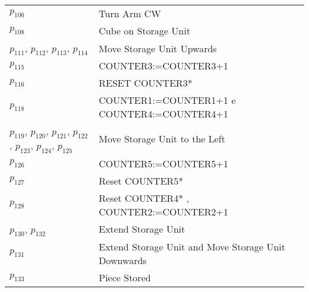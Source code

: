 \begin{longtable}{M{5cm}M{10cm}}
\hyperlink{completeNet:p106}{\hypertarget{completeTable:p106}{$p_{106}$}} & Turn Arm CW\\
\hyperlink{completeNet:p108}{\hypertarget{completeTable:p108}{$p_{108}$}} & Cube on Storage Unit\\
\hyperlink{completeNet:p111}{\hypertarget{completeTable:p111}{$p_{111}$}}, \hyperlink{completeNet:p112}{\hypertarget{completeTable:p112}{$p_{112}$}}, \hyperlink{completeNet:p113}{\hypertarget{completeTable:p113}{$p_{113}$}}, \hyperlink{completeNet:p114}{\hypertarget{completeTable:p114}{$p_{114}$}} & Move Storage Unit Upwards\\
\hyperlink{completeNet:p115}{\hypertarget{completeTable:p115}{$p_{115}$}} & COUNTER3:=COUNTER3+1\\
\hyperlink{completeNet:p116}{\hypertarget{completeTable:p116}{$p_{116}$}} & RESET COUNTER3*\\
\hyperlink{completeNet:p118}{\hypertarget{completeTable:p118}{$p_{118}$}} & COUNTER1:=COUNTER1+1 e COUNTER4:=COUNTER4+1\\
\hyperlink{completeNet:p119}{\hypertarget{completeTable:p119}{$p_{119}$}}, \hyperlink{completeNet:p120}{\hypertarget{completeTable:p120}{$p_{120}$}}, \hyperlink{completeNet:p121}{\hypertarget{completeTable:p121}{$p_{121}$}}, \hyperlink{completeNet:p122}{\hypertarget{completeTable:p122}{$p_{122}$}}, \hyperlink{completeNet:p123}{\hypertarget{completeTable:p123}{$p_{123}$}}, \hyperlink{completeNet:p124}{\hypertarget{completeTable:p124}{$p_{124}$}}, \hyperlink{completeNet:p125}{\hypertarget{completeTable:p125}{$p_{125}$}} & Move Storage Unit to the Left\\
\hyperlink{completeNet:p126}{\hypertarget{completeTable:p126}{$p_{126}$}} & COUNTER5:=COUNTER5+1\\
\hyperlink{completeNet:p127}{\hypertarget{completeTable:p127}{$p_{127}$}} & Reset COUNTER5*\\
\hyperlink{completeNet:p128}{\hypertarget{completeTable:p128}{$p_{128}$}} & Reset COUNTER4* , COUNTER2:=COUNTER2+1\\
\hyperlink{completeNet:p130}{\hypertarget{completeTable:p130}{$p_{130}$}}, \hyperlink{completeNet:p132}{\hypertarget{completeTable:p132}{$p_{132}$}} & Extend Storage Unit\\
\hyperlink{completeNet:p131}{\hypertarget{completeTable:p131}{$p_{131}$}} & Extend Storage Unit and Move Storage Unit Downwards\\
\hyperlink{completeNet:p133}{\hypertarget{completeTable:p133}{$p_{133}$}} & Piece Stored\\

\end{longtable}
